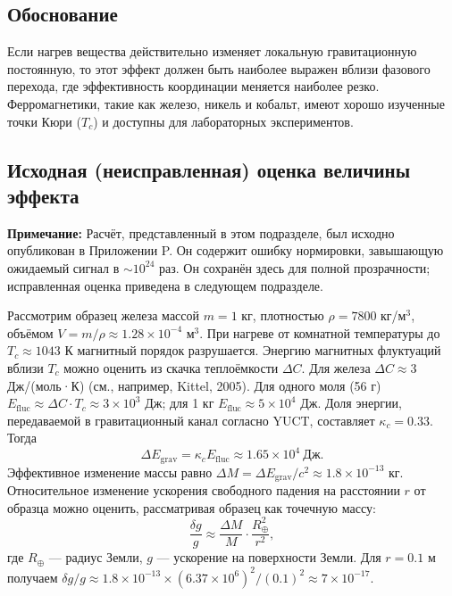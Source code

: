\documentclass[12pt]{article}
\theoremstyle{remark}
\newcommand{\kappac}{\kappa_c}
\begin{document}
	\subsection{Обоснование}
	\label{subsec:lab-rationale}
	
	Если нагрев вещества действительно изменяет локальную гравитационную постоянную, то этот эффект должен быть наиболее выражен вблизи фазового перехода, где эффективность координации меняется наиболее резко. Ферромагнетики, такие как железо, никель и кобальт, имеют хорошо изученные точки Кюри ($T_c$) и доступны для лабораторных экспериментов.
	
	\subsection{Исходная (неисправленная) оценка величины эффекта}
	\label{subsec:lab-estimate-uncorrected}
	
	\textbf{Примечание:} Расчёт, представленный в этом подразделе, был исходно опубликован в Приложении P. Он содержит ошибку нормировки, завышающую ожидаемый сигнал в $\sim 10^{24}$ раз. Он сохранён здесь для полной прозрачности; исправленная оценка приведена в следующем подразделе.
	
	Рассмотрим образец железа массой $m = 1$ кг, плотностью $\rho = 7800$ кг/м$^3$, объёмом $V = m/\rho \approx 1.28\times10^{-4}$ м$^3$. При нагреве от комнатной температуры до $T_c \approx 1043$ К магнитный порядок разрушается. Энергию магнитных флуктуаций вблизи $T_c$ можно оценить из скачка теплоёмкости $\Delta C$. Для железа $\Delta C \approx 3$ Дж/(моль·К) (см., например, Kittel, 2005). Для одного моля (56 г) $E_{\text{fluc}} \approx \Delta C \cdot T_c \approx 3\times10^3$ Дж; для 1 кг $E_{\text{fluc}} \approx 5\times10^4$ Дж. Доля энергии, передаваемой в гравитационный канал согласно YUCT, составляет $\kappac = 0.33$. Тогда
	\begin{equation}
		\Delta E_{\text{grav}} = \kappac E_{\text{fluc}} \approx 1.65\times10^4\ \text{Дж}.
	\end{equation}
	Эффективное изменение массы равно $\Delta M = \Delta E_{\text{grav}} / c^2 \approx 1.8\times10^{-13}$ кг. Относительное изменение ускорения свободного падения на расстоянии $r$ от образца можно оценить, рассматривая образец как точечную массу:
	\begin{equation}
		\frac{\delta g}{g} \approx \frac{\Delta M}{M} \cdot \frac{R_\oplus^2}{r^2},
		\label{eq:delta-g-estimate-orig}
	\end{equation}
	где $R_\oplus$ — радиус Земли, $g$ — ускорение на поверхности Земли. Для $r = 0.1$ м получаем $\delta g/g \approx 1.8\times10^{-13} \times (6.37\times10^6)^2 / (0.1)^2 \approx 7\times10^{-17}$.
	
\end{document}
